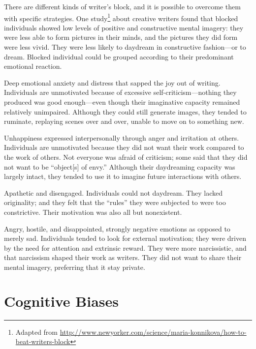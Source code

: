 \documentclass[12pt]{article}
\begin{document}
There are different kinds of writer's block, and it is possible to overcome them with specific strategies.
One study\footnote{Adapted from \url{http://www.newyorker.com/science/maria-konnikova/how-to-beat-writers-block}} about creative writers found that blocked individuals showed low levels of positive and constructive mental imagery: they were less able to form pictures in their minds, and the pictures they did form were less vivid.
They were less likely to daydream in constructive fashion—or to dream.
Blocked individual could be grouped according to their predominant emotional reaction.
\begin{compactitem}
\item Deep emotional anxiety and distress that sapped the joy out of writing.
 Individuals are unmotivated because of excessive self-criticism—nothing they produced was good enough—even though their imaginative capacity remained relatively unimpaired. Although they could still generate images, they tended to ruminate, replaying scenes over and over, unable to move on to something new.
\item Unhappiness expressed interpersonally through anger and irritation at others.
  Individuals are unmotivated because they did not want their work compared to the work of others.
  Not everyone was afraid of criticism; some said that they did not want to be ``object[s] of envy.''
  Although their daydreaming capacity was largely intact, they tended to use it to imagine future interactions with others. 
\item Apathetic and disengaged. Individuals could not daydream.
 They lacked originality; and they felt that the ``rules'' they were subjected to were too constrictive.
 Their motivation was also all but nonexistent. 
\item Angry, hostile, and disappointed, strongly negative emotions as opposed to merely sad.
  Individuals tended to look for external motivation; they were driven by the need for attention and extrinsic reward.
  They were more narcissistic, and that narcissism shaped their work as writers.
  They did not want to share their mental imagery, preferring that it stay private.
\end{compactitem}

\section{Cognitive Biases}
\end{document}
